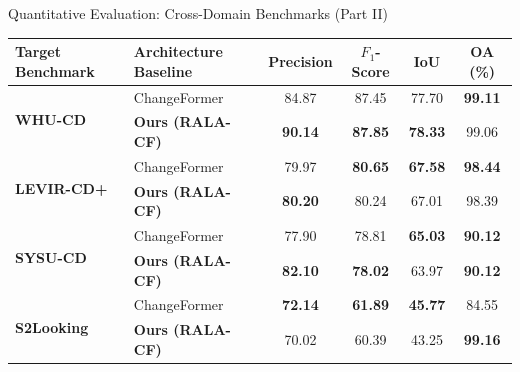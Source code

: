 \documentclass[aspectratio=169]{beamer}
\begin{document}
\begin{frame}{Quantitative Evaluation: Cross-Domain Benchmarks (Part II)}

\centering

\renewcommand{\arraystretch}{1.15}
\small
\begin{tabular}{|l|l|c|c|c|c|}
\hline
\textbf{Target Benchmark} & \textbf{Architecture Baseline} & \textbf{Precision} & \textbf{$F_1$-Score} & \textbf{IoU} & \textbf{OA (\%)} \\
\hline
\hline
\multirow{2}{*}{\textbf{WHU-CD}}    & ChangeFormer & 84.87 & 87.45 & 77.70 & \textbf{99.11} \\ \cline{2-6}
                           & \textbf{Ours (RALA-CF)} & \cellcolor{pastelorange}\textbf{90.14} & \cellcolor{pastelorange}\textbf{87.85} & \cellcolor{pastelorange}\textbf{78.33} & \cellcolor{pastelorange} 99.06 \\
\hline
\hline
\multirow{2}{*}{\textbf{LEVIR-CD+}} & ChangeFormer & 79.97 & \textbf{80.65} & \textbf{67.58} & \textbf{98.44} \\ \cline{2-6}
                           & \textbf{Ours (RALA-CF)} & \cellcolor{pastelorange}\textbf{80.20} & \cellcolor{pastelorange} 80.24 & \cellcolor{pastelorange} 67.01 & \cellcolor{pastelorange} 98.39 \\
\hline
\hline
\multirow{2}{*}{\textbf{SYSU-CD}}   & ChangeFormer & 77.90 & 78.81 & \textbf{65.03} & \textbf{90.12} \\ \cline{2-6}
                           & \textbf{Ours (RALA-CF)} & \cellcolor{pastelorange}\textbf{82.10} & \cellcolor{pastelorange}\textbf{78.02} & \cellcolor{pastelorange} 63.97 & \cellcolor{pastelorange}\textbf{90.12} \\
\hline
\hline
\multirow{2}{*}{\textbf{S2Looking}} & ChangeFormer & \textbf{72.14} & \textbf{61.89} & \textbf{45.77} & 84.55 \\ \cline{2-6}
                           & \textbf{Ours (RALA-CF)} & \cellcolor{pastelorange} 70.02 & \cellcolor{pastelorange} 60.39 & \cellcolor{pastelorange} 43.25 & \cellcolor{pastelorange}\textbf{99.16} \\
\hline
\end{tabular}

\end{frame}
\end{document}
